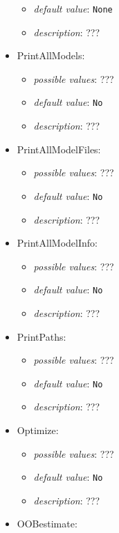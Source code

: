 \documentclass{article}
\begin{document}
\begin{itemize}
\begin{itemize}
                \item \emph{default value}: \texttt{None}
                \item \emph{description}: ???
           \end{itemize}
    \item PrintAllModels:
           \begin{itemize}
                \item \emph{possible values}: ???
                \item \emph{default value}: \texttt{No}
                \item \emph{description}: ???
           \end{itemize}
    \item PrintAllModelFiles:
           \begin{itemize}
                \item \emph{possible values}: ???
                \item \emph{default value}: \texttt{No}
                \item \emph{description}: ???
           \end{itemize}
    \item PrintAllModelInfo:
           \begin{itemize}
                \item \emph{possible values}: ???
                \item \emph{default value}: \texttt{No}
                \item \emph{description}: ???
           \end{itemize}
    \item PrintPaths:
           \begin{itemize}
                \item \emph{possible values}: ???
                \item \emph{default value}: \texttt{No}
                \item \emph{description}: ???
           \end{itemize}
    \item Optimize:
           \begin{itemize}
                \item \emph{possible values}: ???
                \item \emph{default value}: \texttt{No}
                \item \emph{description}: ???
           \end{itemize}
    \item OOBestimate:

\end{itemize}
\end{document}
